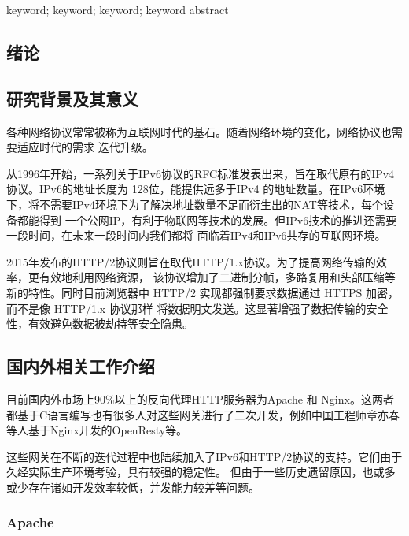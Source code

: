 \documentclass[twoside]{CUGThesis}
\begin{document}
	\begin{enabstract}{keyword; keyword; keyword; keyword}
		abstract
	\end{enabstract}
	
	\makeToc
	
	
	\begin{spacing}{2}
		\section{绪论}
	\end{spacing}
	\subsection{研究背景及其意义}
	各种网络协议常常被称为互联网时代的基石。随着网络环境的变化，网络协议也需要适应时代的需求
	迭代升级。\par
	从1996年开始，一系列关于IPv6协议的RFC标准发表出来，旨在取代原有的IPv4协议。IPv6的地址长度为
	128位，能提供远多于IPv4 的地址数量。在IPv6环境下，将不需要IPv4环境下为了解决地址数量不足而衍生出的NAT等技术，每个设备都能得到
	一个公网IP，有利于物联网等技术的发展。但IPv6技术的推进还需要一段时间，在未来一段时间内我们都将
	面临着IPv4和IPv6共存的互联网环境。\par
		2015年发布的HTTP/2协议则旨在取代HTTP/1.x协议。为了提高网络传输的效率，更有效地利用网络资源，
	该协议增加了二进制分帧，多路复用和头部压缩等新的特性。同时目前浏览器中 HTTP/2 
	实现都强制要求数据通过 HTTPS 加密，而不是像 HTTP/1.x 协议那样
	将数据明文发送。这显著增强了数据传输的安全性，有效避免数据被劫持等安全隐患。\par
	\subsection{国内外相关工作介绍}
	目前国内外市场上90\%以上的反向代理HTTP服务器为Apache 和 Nginx。这两者都基于C语言编写也有很多人对这些网关进行了二次开发，例如中国工程师章亦春等人基于Nginx开发的OpenResty\cite{OpenResty}等。\par
	这些网关在不断的迭代过程中也陆续加入了IPv6和HTTP/2协议的支持。它们由于久经实际生产环境考验，具有较强的稳定性。
	但由于一些历史遗留原因，也或多或少存在诸如开发效率较低，并发能力较差等问题。
	\subsubsection{Apache}
\end{document}
